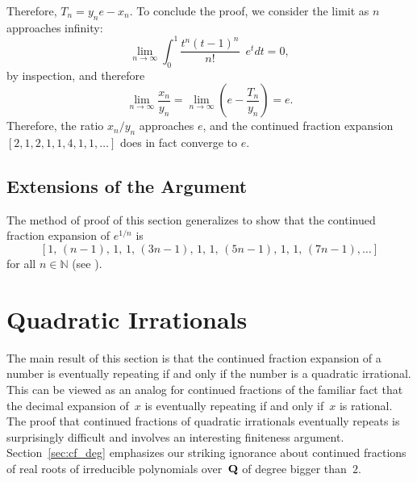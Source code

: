 Therefore, $T_n=y_ne-x_n$. To conclude the proof, we consider the limit
as $n$ approaches infinity:
$$
  \lim_{n \to \infty}\int_{0}^{1}\frac{t^{n}(t-1)^{n}}{n!}\phantom{1} e^tdt=0,
$$
by inspection, and therefore
$$
  \lim_{n \to \infty}\frac{x_n}{y_n}=\lim_{n \to \infty}(e-\frac{T_n}{y_n})=e.
$$
Therefore, the ratio $x_n/y_n$ approaches $e$, and the continued
fraction expansion $[2,1,2,1,1,4,1,1,\ldots]$ does in fact converge to
$e$.

\subsection{Extensions of the Argument}
The method of proof of this section generalizes to show that
the continued fraction expansion of $e^{1/n}$ is
$$
  [1,\,(n-1),\,1,\,1,\,(3n-1),\,1,\,1,\,(5n-1),\,1,\,1,\,(7n-1),\ldots]
$$
for all $n \in \mathbb{N}$ (see ).



\section{Quadratic Irrationals}\label{sec:cfqi}
The main result of this section is that the continued fraction
expansion of a number is eventually repeating if and only if the
number is a quadratic irrational.  This can be viewed as an analog
for continued fractions of the familiar fact that the decimal
expansion of~$x$ is eventually repeating if and only if~$x$ is
rational.  The proof that continued fractions of quadratic irrationals
eventually repeats is surprisingly difficult and involves an
interesting finiteness argument.
Section~\ref{sec:cf_deg} emphasizes our striking ignorance about
continued fractions of real roots of irreducible polynomials over~$\mathbf{Q}$
of degree bigger than~$2$.

